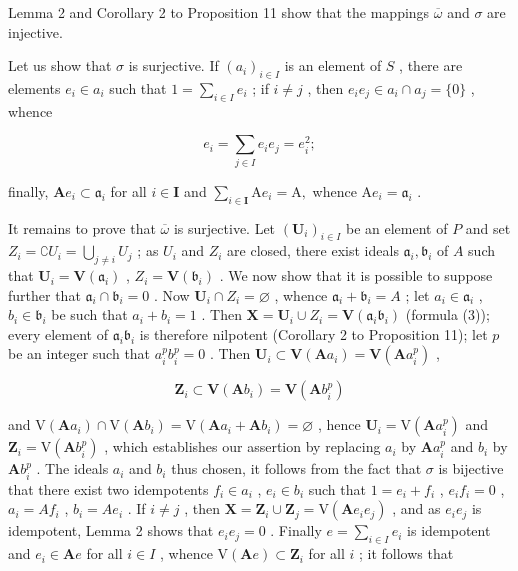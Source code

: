 Lemma 2 and Corollary 2 to Proposition 11 show that the mappings \(\overline{\omega}\) and \(\sigma\) are injective.

Let us show that \(\sigma\) is surjective. If \((a_{i})_{i\in I}\) is an element of \(S\) , there are elements \(e_i\in a_i\) such that \(1 = \sum_{i\in I}e_i\) ; if \(i\neq j\) , then \(e_i e_j\in a_i\cap a_j = \{0\}\) , whence

\[
e _ {i} = \sum_ {j \in I} e _ {i} e _ {j} = e _ {i} ^ {2};
\]

finally, \(\mathbf{A}e_{i}\subset \mathfrak{a}_{i}\) for all \(i\in \mathbf{I}\) and \(\sum_{i\in \mathbf{I}}\mathrm{A}e_i = \mathrm{A},\) whence \(\mathrm{A}e_{i} = \mathfrak{a}_{i}\) .

It remains to prove that \(\overline{\omega}\) is surjective. Let \((\mathbf{U}_i)_{i\in I}\) be an element of \(P\) and set \(Z_{i} = \complement U_{i} = \bigcup_{j\neq i}U_{j}\) ; as \(U_{i}\) and \(Z_{i}\) are closed, there exist ideals \(\mathfrak{a}_i,\mathfrak{b}_i\) of \(A\) such that \(\mathbf{U}_i = \mathbf{V}(\mathfrak{a}_i)\) , \(Z_{i} = \mathbf{V}(\mathfrak{b}_{i})\) . We now show that it is possible to suppose further that \(\mathfrak{a}_i\cap \mathfrak{b}_i = 0\) . Now \(\mathbf{U}_i\cap Z_i = \varnothing\) , whence \(\mathfrak{a}_i + \mathfrak{b}_i = A\) ; let \(a_i\in \mathfrak{a}_i\) , \(b_{i}\in \mathfrak{b}_{i}\) be such that \(a_{i} + b_{i} = 1\) . Then \(\mathbf{X} = \mathbf{U}_i\cup Z_i = \mathbf{V}(\mathfrak{a}_i\mathfrak{b}_i)\) (formula (3)); every element of \(\mathfrak{a}_i\mathfrak{b}_i\) is therefore nilpotent (Corollary 2 to Proposition 11); let \(p\) be an integer such that \(a_i^p b_i^p = 0\) . Then \(\mathbf{U}_i\subset \mathbf{V}(\mathbf{A}a_i) = \mathbf{V}(\mathbf{A}a_i^p)\) ,

\[
\mathbf {Z} _ {i} \subset \mathbf {V} (\mathbf {A} b _ {i}) = \mathbf {V} (\mathbf {A} b _ {i} ^ {p})
\]

and \(\mathrm{V}(\mathbf{A}a_i)\cap \mathrm{V}(\mathbf{A}b_i) = \mathrm{V}(\mathbf{A}a_i + \mathbf{A}b_i) = \varnothing\) , hence \(\mathbf{U}_i = \mathrm{V}(\mathbf{A}a_i^p)\) and \(\mathbf{Z}_i = \mathrm{V}(\mathbf{A}b_i^p)\) , which establishes our assertion by replacing \(a_i\) by \(\mathbf{A}a_i^p\) and \(b_i\) by \(\mathbf{A}b_i^p\) . The ideals \(a_i\) and \(b_i\) thus chosen, it follows from the fact that \(\sigma\) is bijective that there exist two idempotents \(f_i\in a_i\) , \(e_i\in b_i\) such that \(1 = e_i + f_i\) , \(e_i f_i = 0\) , \(a_i = Af_i\) , \(b_i = Ae_i\) . If \(i\neq j\) , then \(\mathbf{X} = \mathbf{Z}_i\cup \mathbf{Z}_j = \mathrm{V}(\mathbf{A}e_i e_j)\) , and as \(e_i e_j\) is idempotent, Lemma 2 shows that \(e_i e_j = 0\) . Finally \(e = \sum_{i\in I}e_i\) is idempotent and \(e_i\in \mathbf{A}e\) for all \(i\in I\) , whence \(\mathrm{V}(\mathbf{A}e)\subset \mathbf{Z}_i\) for all \(i\) ; it follows that

